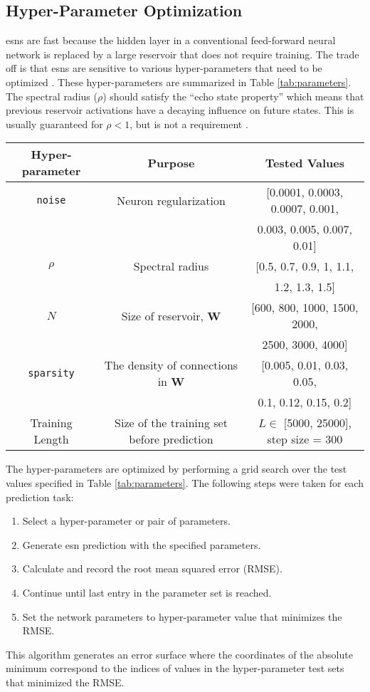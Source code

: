  \subsection{Hyper-Parameter Optimization}

 \glspl{esn} are fast because the hidden layer in a conventional feed-forward neural network is replaced by a large reservoir that does not require training.
 The trade off is that \glspl{esn} are sensitive to various hyper-parameters
 that need to be optimized \cite{lukosevicius_practical_2012}. These hyper-parameters are summarized in Table \ref{tab:parameters}. The spectral radius ($\rho$) should satisfy the ``echo state property'' which means that
 previous reservoir activations have a decaying influence on future states. This
 is usually guaranteed for $\rho < 1$, but is not a requirement
 \cite{lukosevicius_practical_2012}.
 \begin{table*}[ht]
   \centering
   \caption{Description of Model Hyper-Parameters}
   \label{tab:parameters}
   \begin{tabular}{c|c|c}
     \hline
     Hyper-parameter & Purpose & Tested Values\\
     \hline
     \texttt{noise} & Neuron regularization & [0.0001, 0.0003, 0.0007, 0.001, \\
     &&0.003, 0.005, 0.007, 0.01]\\
     $\rho$ & Spectral radius & [0.5, 0.7, 0.9, 1, 1.1, \\
     &&1.2, 1.3, 1.5]\\
     $N$ & Size of reservoir, \textbf{W} & [600, 800, 1000, 1500, 2000, \\
     &&2500, 3000, 4000]\\
     \texttt{sparsity} & The density of connections in \textbf{W}& [0.005, 0.01, 0.03, 0.05, \\
     &&0.1, 0.12, 0.15, 0.2]\\
     Training Length & Size of the training set before prediction & $L \in$ [5000, 25000], step size = 300
   \end{tabular}
 \end{table*}

 The hyper-parameters are optimized by performing a grid search over the test values specified in Table \ref{tab:parameters}. The following steps were taken for each prediction task:
 \begin{enumerate}
   \item Select a hyper-parameter or pair of parameters.
   \item Generate \gls{esn} prediction with the specified parameters.
   \item Calculate and record the root mean squared error (RMSE).
   \item Continue until last entry in the parameter set is reached.
   \item Set the network parameters to hyper-parameter value that minimizes the RMSE.
 \end{enumerate}
 This algorithm generates an error surface where the coordinates of the absolute
 minimum correspond to the indices of values in the hyper-parameter test sets that minimized the RMSE.

